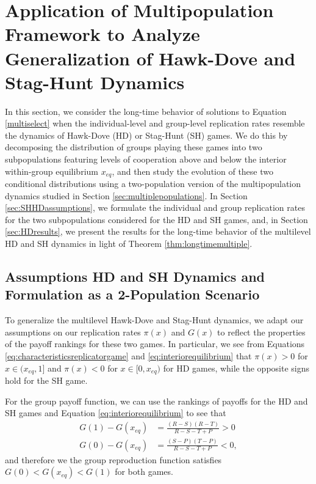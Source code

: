 \documentclass[11pt]{article}
\numberwithin{equation}{section}
\begin{document}
{\section{Application of Multipopulation Framework to Analyze Generalization of Hawk-Dove and Stag-Hunt Dynamics}
  \label{sec:HDSH}
 
 In this section, we consider the long-time behavior of solutions to Equation \eqref{multiselect} when the individual-level and group-level replication rates resemble the dynamics of Hawk-Dove (HD) or Stag-Hunt (SH) games. We do this by decomposing the distribution of groups playing these games into two subpopulations featuring levels of cooperation above and below the interior within-group equilibrium $x_{eq}$, and then study the evolution of these two conditional distributions using a two-population version of the multipopulation dynamics studied in Section \ref{sec:multiplepopulations}. In Section \eqref{sec:SHHDassumptions}, we formulate the individual and group replication rates for the two subpopulations considered for the HD and SH games, and, in Section \ref{sec:HDresults}, we present the results for the long-time behavior of the multilevel HD and SH dynamics in light of Theorem \ref{thm:longtimemultiple}. 
 
 
  \subsection{Assumptions HD and SH Dynamics and Formulation as a 2-Population Scenario}
  \label{sec:SHHDassumptions}

To generalize the multilevel Hawk-Dove and Stag-Hunt dynamics, we adapt our assumptions on our replication rates $\pi(x)$ and $G(x)$ to reflect the properties of the payoff rankings for these two games. In particular, we see from Equations \ref{eq:characteristicsreplicatorgame} and \ref{eq:interiorequilibrium} that $\pi(x) > 0$ for $x \in (x_{eq},1]$ and $\pi(x) < 0$ for $x \in [0,x_{eq})$ for HD games, while the opposite signs hold for the SH game. 

For the group payoff function, we can use the rankings of payoffs for the HD and SH games and Equation \ref{eq:interiorequilibrium} to see that
\begin{equation} \label{eq:Gxeqinequality}
\begin{aligned}
    G(1) - G(x_{eq}) &= \frac{\left(R - S\right) \left(R -T\right)}{R-S-T+P} > 0 \\ 
    G(0) - G(x_{eq}) &= \frac{\left(S-P\right)\left(T-P\right)}{R-S-T+P} < 0,
    \end{aligned}
\end{equation}
and therefore we the group reproduction function satisfies $G(0) < G(x_{eq}) < G(1)$ for both games.

}
\end{document}
